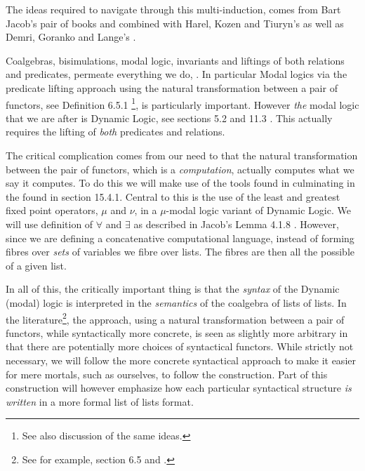 The ideas required to navigate through this multi-induction, comes from 
Bart Jacob's pair of books \cite{jacobs1999categoricalLogicTypeTheory} and 
\cite{jacobs2017coalgebras} combined with Harel, Kozen and Tiuryn's 
\cite{harelKozenTiuryn2000dynamicLogic} as well as Demri, Goranko and 
Lange's \cite{demriGorankoLange2016temporalLogics}. 

Coalgebras, bisimulations, modal logic, invariants and liftings of both 
relations and predicates, permeate everything we do, 
\cite{jacobs2017coalgebras}. In particular Modal logics via the predicate 
lifting approach using the natural transformation between a pair of 
functors, see Definition 6.5.1 \cite{jacobs2017coalgebras}\footnote{See 
also \cite{kupkePattinson2011coalgModalLogics} discussion of the same 
ideas.}, is particularly important. However \emph{the} modal logic that we 
are after is Dynamic Logic, see sections 5.2 and 11.3 
\cite{harelKozenTiuryn2000dynamicLogic}. This  actually 
requires the lifting of \emph{both} predicates and relations.

The critical complication comes from our need to  that the 
natural transformation between the pair of functors, which is a 
\emph{computation}, actually computes what we say it computes. To do this 
we will make use of the tools found in 
\cite{demriGorankoLange2016temporalLogics} culminating in the 
 found in section 
15.4.1. Central to this is the use of the least and greatest fixed point 
operators, $\mu$ and $\nu$, in a $\mu$-modal logic variant of Dynamic 
Logic. We will use  definition of $\forall$ 
and $\exists$ as described in Jacob's Lemma 4.1.8 
\cite{jacobs1999categoricalLogicTypeTheory}. However, since we are 
defining a concatenative computational language, instead of forming fibres 
over \emph{sets} of variables we fibre over lists. The fibres are then all 
the possible  of a given list. 

In all of this, the critically important thing is that the \emph{syntax} 
of the Dynamic (modal) logic is interpreted in the \emph{semantics} of the 
coalgebra of lists of lists. In the literature\footnote{See for example, 
\cite{jacobs2017coalgebras} section 6.5 and 
\cite{kupkePattinson2011coalgModalLogics}.}, the  
approach, using a natural transformation between a pair of functors, while 
syntactically more concrete, is seen as slightly more arbitrary in that 
there are potentially more choices of syntactical functors. While strictly 
not necessary, we will follow the more concrete syntactical 
 approach to make it easier for mere mortals, 
such as ourselves, to follow the construction. Part of this construction 
will however emphasize how each particular syntactical structure \emph{is 
written} in a more formal list of lists format. 

